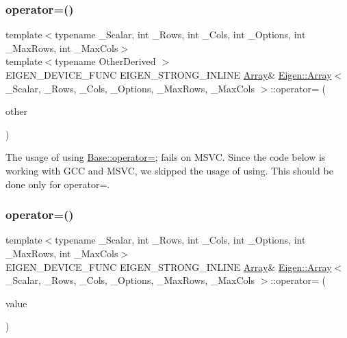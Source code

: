 \subsubsection{\texorpdfstring{operator=()}{operator=()}\hspace{0.1cm}{\footnotesize\ttfamily [1/4]}}
{\footnotesize\ttfamily template$<$typename \+\_\+\+Scalar, int \+\_\+\+Rows, int \+\_\+\+Cols, int \+\_\+\+Options, int \+\_\+\+Max\+Rows, int \+\_\+\+Max\+Cols$>$ \\
template$<$typename Other\+Derived $>$ \\
E\+I\+G\+E\+N\+\_\+\+D\+E\+V\+I\+C\+E\+\_\+\+F\+U\+NC E\+I\+G\+E\+N\+\_\+\+S\+T\+R\+O\+N\+G\+\_\+\+I\+N\+L\+I\+NE \mbox{\hyperlink{class_eigen_1_1_array}{Array}}\& \mbox{\hyperlink{class_eigen_1_1_array}{Eigen\+::\+Array}}$<$ \+\_\+\+Scalar, \+\_\+\+Rows, \+\_\+\+Cols, \+\_\+\+Options, \+\_\+\+Max\+Rows, \+\_\+\+Max\+Cols $>$\+::operator= (\begin{DoxyParamCaption}\item[{const \mbox{\hyperlink{struct_eigen_1_1_eigen_base}{Eigen\+Base}}$<$ Other\+Derived $>$ \&}]{other }\end{DoxyParamCaption})\hspace{0.3cm}{\ttfamily [inline]}}

The usage of using \mbox{\hyperlink{class_eigen_1_1_plain_object_base_a75308f8a23a03f045a1260611e2054a0}{Base\+::operator=}}; fails on M\+S\+VC. Since the code below is working with G\+CC and M\+S\+VC, we skipped the usage of \textquotesingle{}using\textquotesingle{}. This should be done only for operator=. \mbox{\label{class_eigen_1_1_array_ab77cffb759a431d4a55ed150e850805a}} 
\subsubsection{\texorpdfstring{operator=()}{operator=()}\hspace{0.1cm}{\footnotesize\ttfamily [2/4]}}
{\footnotesize\ttfamily template$<$typename \+\_\+\+Scalar, int \+\_\+\+Rows, int \+\_\+\+Cols, int \+\_\+\+Options, int \+\_\+\+Max\+Rows, int \+\_\+\+Max\+Cols$>$ \\
E\+I\+G\+E\+N\+\_\+\+D\+E\+V\+I\+C\+E\+\_\+\+F\+U\+NC E\+I\+G\+E\+N\+\_\+\+S\+T\+R\+O\+N\+G\+\_\+\+I\+N\+L\+I\+NE \mbox{\hyperlink{class_eigen_1_1_array}{Array}}\& \mbox{\hyperlink{class_eigen_1_1_array}{Eigen\+::\+Array}}$<$ \+\_\+\+Scalar, \+\_\+\+Rows, \+\_\+\+Cols, \+\_\+\+Options, \+\_\+\+Max\+Rows, \+\_\+\+Max\+Cols $>$\+::operator= (\begin{DoxyParamCaption}\item[{const Scalar \&}]{value }\end{DoxyParamCaption})\hspace{0.3cm}{\ttfamily [inline]}}

